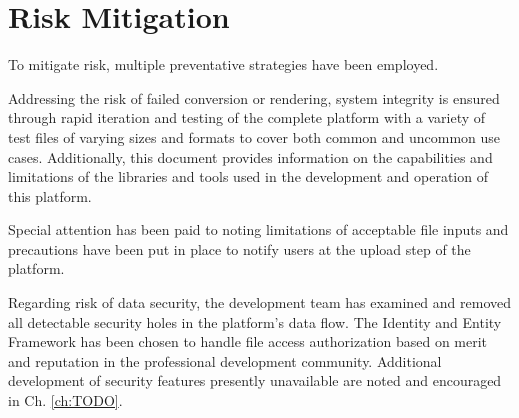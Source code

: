 
\section{Risk Mitigation}
To mitigate risk, multiple preventative strategies have been employed.

Addressing the risk of failed conversion or rendering, system integrity is ensured through rapid iteration and testing of the complete platform with a variety of test files of varying sizes and formats to cover both common and uncommon use cases.
Additionally, this document provides information on the capabilities and limitations of the libraries and tools used in the development and operation of this platform.

Special attention has been paid to noting limitations of acceptable file inputs and precautions have been put in place to notify users at the upload step of the platform. 

Regarding risk of data security, the development team has examined and removed all detectable security holes in the platform's data flow. The Identity and Entity Framework has been chosen to handle file access authorization based on merit and reputation in the professional development community. Additional development of security features presently unavailable are noted and encouraged in Ch. \ref{ch:TODO}.